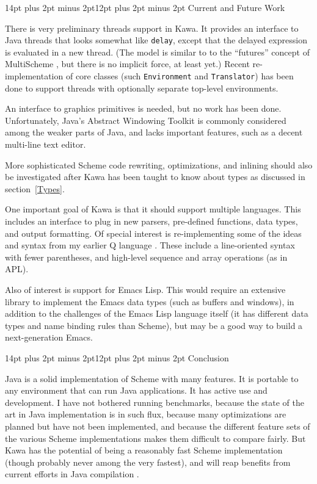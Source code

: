 \documentclass[twocolumn]{article}
\makeatletter
\def\section{\@startsection {section}{1}{\z@}
   {14pt plus 2pt minus 2pt}{12pt plus 2pt minus 2pt} {\large\bf}}
\makeatother
\begin{document}
\section{Current and Future Work}

There is very  preliminary threads support in Kawa.
It provides an interface to Java threads that looks
somewhat like {\tt delay}, except that the delayed expression
is evaluated in a new thread.  (The model is similar to
to the ``futures'' concept of MultiScheme \cite{Miller:phd:1987},
but there is no implicit force, at least yet.)  Recent re-implementation
of core classes (such {\tt Environment} and {\tt Translator})
has been done to support threads with optionally separate
top-level environments.

An interface to graphics primitives is needed, but no work has been
done.  Unfortunately, Java's Abstract Windowing Toolkit is commonly
considered among the weaker parts of Java, and lacks important
features, such as a decent multi-line text editor.

More sophisticated Scheme code rewriting, optimizations,
and inlining should also be investigated after Kawa has been
taught to know about types as discussed in section~\ref{Types}.

One important goal of Kawa is that it should support
multiple languages.  This includes an interface to plug in
new parsers, pre-defined functions, data types, and output
formatting.
Of special interest is re-implementing some of the ideas and syntax
from my earlier Q language  \cite{PBthesis}. These include a
line-oriented syntax with fewer parentheses, and high-level
sequence and array operations (as in APL).

Also of interest is support for Emacs Lisp.
This would require an extensive library to implement the Emacs
data types (such as buffers and windows), in addition to the
challenges of the Emacs Lisp language itself (it has different
data types and name binding rules than Scheme), but may be
a good way to build a next-generation Emacs.

\section{Conclusion}

Java is a solid implementation of Scheme with many features.
It is portable to any environment that can run Java applications.
It has active use and development.
I have not bothered running benchmarks, because the state
of the art in Java implementation is in such flux, because
many optimizations are planned but have not been implemented,
and because the different feature sets of the various Scheme implementations
makes them difficult to compare fairly.
But Kawa has the potential of being
a reasonably fast Scheme implementation (though probably never
among the very fastest), and will reap benefits from current
efforts in Java compilation \cite{GccJava}.
\end{document}
